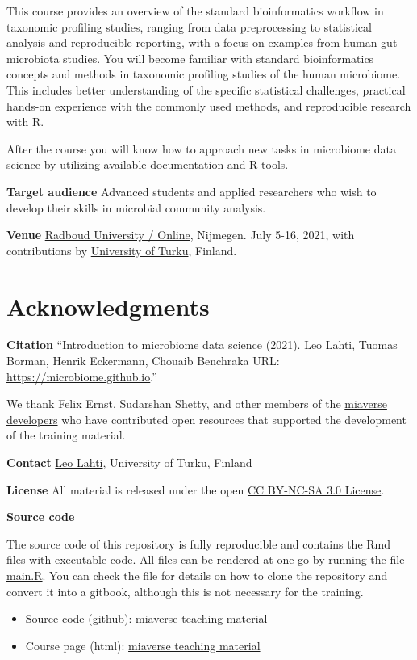 \documentclass[
]{book}
\providecommand{\tightlist}{%
  \setlength{\itemsep}{0pt}\setlength{\parskip}{0pt}}
\begin{document}
This course provides an overview of the standard bioinformatics
workflow in taxonomic profiling studies, ranging from data
preprocessing to statistical analysis and reproducible reporting, with
a focus on examples from human gut microbiota studies. You
will become familiar with standard bioinformatics concepts and methods
in taxonomic profiling studies of the human microbiome. This includes
better understanding of the specific statistical challenges, practical
hands-on experience with the commonly used methods, and reproducible
research with R.

After the course you will know how to approach new tasks in microbiome
data science by utilizing available documentation and R tools.

\textbf{Target audience} Advanced students and applied researchers who wish
to develop their skills in microbial community analysis.

\textbf{Venue} \href{}{Radboud University / Online}, Nijmegen. July 5-16, 2021,
with contributions by \href{http://datascience.utu.fi}{University of
Turku}, Finland.

\hypertarget{acknowledgments}{%
\section{Acknowledgments}\label{acknowledgments}}

\textbf{Citation} ``Introduction to microbiome data science (2021).
Leo Lahti, Tuomas Borman, Henrik Eckermann, Chouaib Benchraka URL: \url{https://microbiome.github.io}.''

We thank Felix Ernst, Sudarshan Shetty, and other members of the
\href{https://microbiome.github.io}{miaverse developers} who have
contributed open resources that supported the development of the
training material.

\textbf{Contact} \href{http://datascience.utu.fi}{Leo Lahti}, University of Turku, Finland

\textbf{License} All material is released under the open \href{LICENSE}{CC BY-NC-SA 3.0 License}.

\textbf{Source code}

The source code of this repository is fully reproducible and contains
the Rmd files with executable code. All files can be rendered at one
go by running the file \url{main.R}. You can check the file for
details on how to clone the repository and convert it into a gitbook,
although this is not necessary for the training.

\begin{itemize}
\tightlist
\item
  Source code (github): \href{https://github.com/microbiome/course_2021_radboud}{miaverse teaching material}
\item
  Course page (html): \href{https://microbiome.github.io/course_2021_radboud/}{miaverse teaching material}
\end{itemize}
\end{document}
